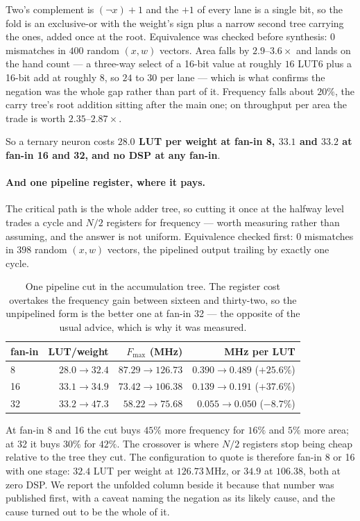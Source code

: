 \documentclass[11pt]{article}
\theoremstyle{definition}
\begin{document}
Two's complement is $(\lnot x)+1$ and the $+1$ of every lane is a single bit, so
the fold is an exclusive-or with the weight's sign plus a narrow second tree
carrying the ones, added once at the root. Equivalence was checked before
synthesis: $0$ mismatches in $400$ random $(x,w)$ vectors. Area falls by
$2.9$--$3.6\times$ and lands on the hand count --- a three-way select of a
16-bit value at roughly $16$ LUT6 plus a 16-bit add at roughly $8$, so $24$ to
$30$ per lane --- which is what confirms the negation was the whole gap rather
than part of it. Frequency falls about $20\%$, the carry tree's root addition
sitting after the main one; on throughput per area the trade is worth
$2.35$--$2.87\times$.

So a ternary neuron costs \textbf{$28.0$ LUT per weight at fan-in 8, $33.1$ and
$33.2$ at fan-in 16 and 32, and no DSP at any fan-in}.

\paragraph{And one pipeline register, where it pays.} The critical path is the
whole adder tree, so cutting it once at the halfway level trades a cycle and
$N/2$ registers for frequency --- worth measuring rather than assuming, and the
answer is not uniform. Equivalence checked first: $0$ mismatches in $398$ random
$(x,w)$ vectors, the pipelined output trailing by exactly one cycle.

\begin{table}[t]\centering
\caption{One pipeline cut in the accumulation tree. The register cost overtakes
the frequency gain between sixteen and thirty-two, so the unpipelined form is
the better one at fan-in 32 --- the opposite of the usual advice, which is why it
was measured.}
\label{tab:nodepipe}
\begin{tabular}{lrrr}
\toprule
fan-in & LUT/weight & $F_{\max}$ (MHz) & MHz per LUT \\
\midrule
8  & $28.0\to\mathbf{32.4}$ & $87.29\to\mathbf{126.73}$ & $0.390\to0.489$ (\textbf{$+25.6\%$}) \\
16 & $33.1\to\mathbf{34.9}$ & $73.42\to\mathbf{106.38}$ & $0.139\to0.191$ (\textbf{$+37.6\%$}) \\
32 & $33.2\to47.3$ & $58.22\to75.68$ & $0.055\to0.050$ ($-8.7\%$) \\
\bottomrule
\end{tabular}
\end{table}

At fan-in 8 and 16 the cut buys $45\%$ more frequency for $16\%$ and $5\%$ more
area; at 32 it buys $30\%$ for $42\%$. The crossover is where $N/2$ registers
stop being cheap relative to the tree they cut. The configuration to quote is
therefore fan-in 8 or 16 with one stage: $32.4$ LUT per weight at $126.73$\,MHz,
or $34.9$ at $106.38$, both at zero DSP. We report the unfolded column beside it because that number was
published first, with a caveat naming the negation as its likely cause, and the
cause turned out to be the whole of it.
\end{document}
